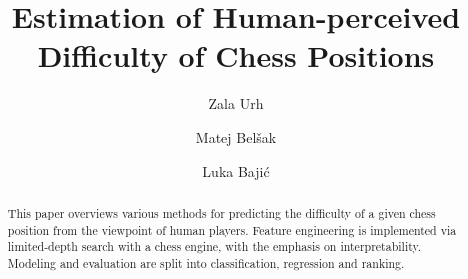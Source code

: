 \documentclass[sigconf,nonacm]{acmart}
\begin{document}
\title{Estimation of Human-perceived Difficulty of Chess Positions}


\author{Zala Urh}

\author{Matej Belšak}

\author{Luka Bajić}

\begin{abstract}
This paper overviews various methods for predicting the difficulty of a given chess position from the viewpoint of human players. Feature engineering is implemented via limited-depth search with a chess engine, with the emphasis on interpretability. Modeling and evaluation are split into classification, regression and ranking. 
\end{abstract}

\end{document}
